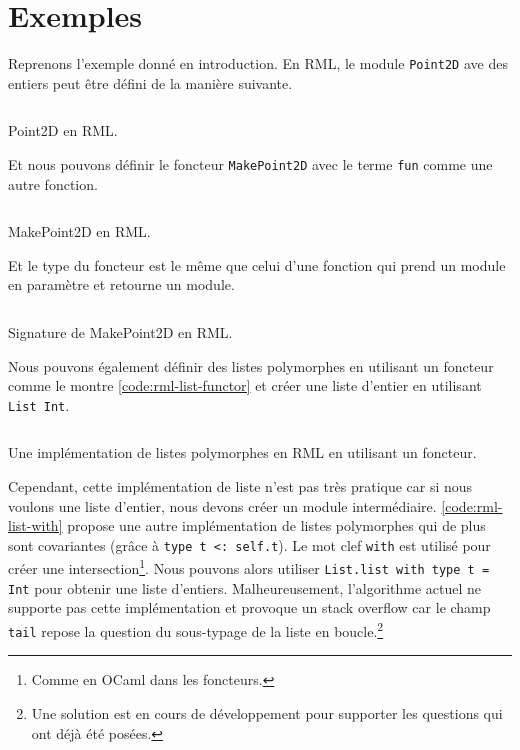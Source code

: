\section{Exemples}

Reprenons l'exemple donné en introduction. En RML, le module \verb|Point2D| ave
des entiers peut être défini de la manière suivante.

\begin{listing}
  \inputminted{OCaml}{codes/point2d.rml}
  \caption{Point2D en RML.}
\end{listing}

Et nous pouvons définir le foncteur \verb|MakePoint2D| avec le terme \verb|fun|
comme une autre fonction.

\begin{listing}
  \inputminted{OCaml}{codes/makepoint2d.rml}
  \caption{MakePoint2D en RML.}
  \label{code:rml-point2d}
\end{listing}

Et le type du foncteur est le même que celui d'une fonction qui prend un module
en paramètre et retourne un module.

\begin{listing}
  \inputminted{OCaml}{codes/makepoint2d_sig.rml}
  \caption{Signature de MakePoint2D en RML.}
  \label{code:rml-makepoint2d}
\end{listing}

Nous pouvons également définir des listes polymorphes en utilisant un foncteur
comme le montre \ref{code:rml-list-functor} et créer une liste d'entier en
utilisant \verb|List Int|.

\begin{listing}
  \inputminted{OCaml}{codes/list_functor.rml}
  \caption{Une implémentation de listes polymorphes en RML en utilisant un foncteur.}
  \label{code:rml-list-functor}
\end{listing}

Cependant, cette implémentation de liste n'est pas très pratique car si nous
voulons une liste d'entier, nous devons créer un module intermédiaire.
\ref{code:rml-list-with} propose une autre implémentation de listes polymorphes
qui de plus sont covariantes (grâce à \verb|type t <: self.t|). Le mot clef
\verb|with| est utilisé pour créer une intersection\footnote{Comme en OCaml dans
  les foncteurs.}. Nous pouvons alors utiliser \verb|List.list with type t = Int|
pour obtenir une liste d'entiers. Malheureusement, l'algorithme actuel ne
supporte pas cette implémentation et provoque un stack overflow car le champ
\verb|tail| repose la question du sous-typage de la liste en
boucle.\footnote{Une solution est en cours de développement pour supporter les
  questions qui ont déjà été posées.}

